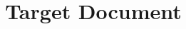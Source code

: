 \documentclass{article}
\title{\projectname Target Document}
\date{\docdate}
\author{\authorname}
\begin{document}
\maketitle
\newpage

\tableofcontents
\newpage


\newpage

\printglossary

\glsaddall
\end{document}

